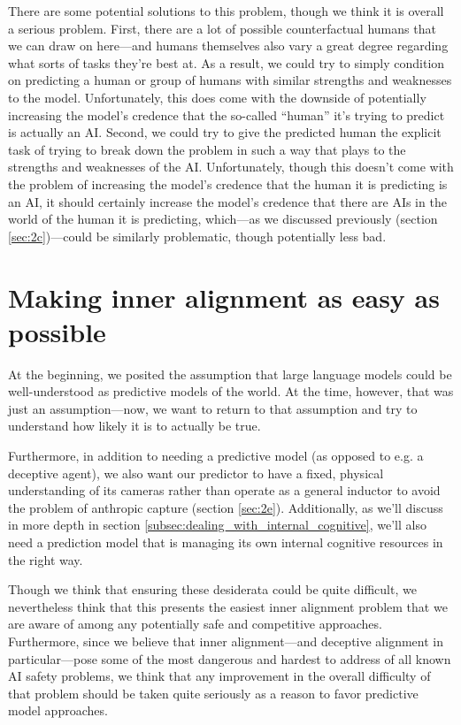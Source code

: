 \documentclass[
  twocolumn,
  natbib,
]{miri-tech-article}
\begin{document}
There are some potential solutions to this problem, though we think it is overall a serious problem. First, there are a lot of possible counterfactual humans that we can draw on here---and humans themselves also vary a great degree regarding what sorts of tasks they're best at. As a result, we could try to simply condition on predicting a human or group of humans with similar strengths and weaknesses to the model. Unfortunately, this does come with the downside of potentially increasing the model's credence that the so-called ``human'' it's trying to predict is actually an AI. Second, we could try to give the predicted human the explicit task of trying to break down the problem in such a way that plays to the strengths and weaknesses of the AI. Unfortunately, though this doesn't come with the problem of increasing the model's credence that the human it is predicting is an AI, it should certainly increase the model's credence that there are AIs in the world of the human it is predicting, which---as we discussed previously (section \ref{sec:2c})---could be similarly problematic, though potentially less bad.





\section{Making inner alignment as easy as possible}
\label{sec:4}

At the beginning, we posited the assumption that large language models could be well-understood as predictive models of the world. At the time, however, that was just an assumption---now, we want to return to that assumption and try to understand how likely it is to actually be true.

Furthermore, in addition to needing a predictive model (as opposed to e.g. a deceptive agent), we also want our predictor to have a fixed, physical understanding of its cameras rather than operate as a general inductor to avoid the problem of anthropic capture (section \ref{sec:2e}). Additionally, as we'll discuss in more depth in section \ref{subsec:dealing_with_internal_cognitive}, we'll also need a prediction model that is managing its own internal cognitive resources in the right way.

Though we think that ensuring these desiderata could be quite difficult, we nevertheless think that this presents the easiest inner alignment problem that we are aware of among any potentially safe and competitive approaches\cite{11_proposals}. Furthermore, since we believe that inner alignment---and deceptive alignment in particular---pose some of the most dangerous and hardest to address of all known AI safety problems\cite{risks}, we think that any improvement in the overall difficulty of that problem should be taken quite seriously as a reason to favor predictive model approaches.
\end{document}
